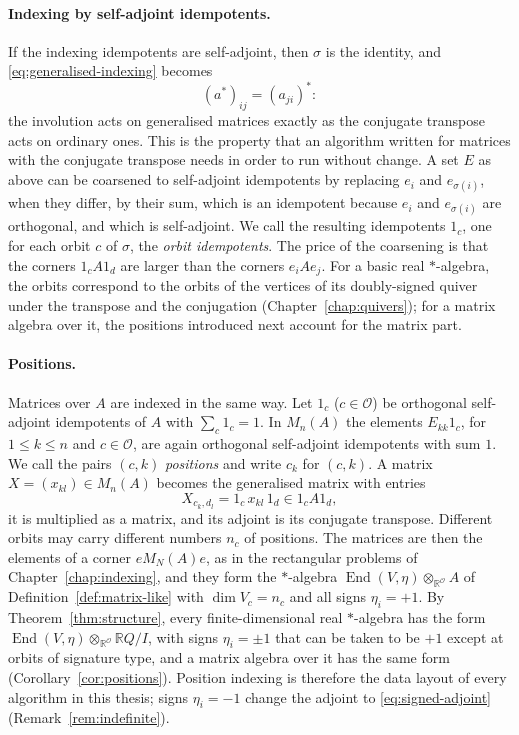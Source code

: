 \documentclass[12pt, a4paper]{report}
\theoremstyle{plain}
\theoremstyle{definition}
\theoremstyle{remark}
\theoremstyle{plain}
\newcommand{\RR}{\mathbb{R}}
\DeclareMathOperator{\End}{End}
\begin{document}
\paragraph{Indexing by self-adjoint idempotents.} If the indexing idempotents are self-adjoint, then $\sigma$ is the identity, and \eqref{eq:generalised-indexing} becomes
\[ (a^*)_{ij}=(a_{ji})^* : \]
the involution acts on generalised matrices exactly as the conjugate transpose acts on ordinary ones. This is the property that an algorithm written for matrices with the conjugate transpose needs in order to run without change. A set $E$ as above can be coarsened to self-adjoint idempotents by replacing $e_i$ and $e_{\sigma(i)}$, when they differ, by their sum, which is an idempotent because $e_i$ and $e_{\sigma(i)}$ are orthogonal, and which is self-adjoint. We call the resulting idempotents $1_c$, one for each orbit $c$ of $\sigma$, the \emph{orbit idempotents}. The price of the coarsening is that the corners $1_cA1_d$ are larger than the corners $e_iAe_j$. For a basic real $*$-algebra, the orbits correspond to the orbits of the vertices of its doubly-signed quiver under the transpose and the conjugation (Chapter~\ref{chap:quivers}); for a matrix algebra over it, the positions introduced next account for the matrix part.

\paragraph{Positions.} Matrices over $A$ are indexed in the same way. Let $1_c$ ($c\in\mathcal O$) be orthogonal self-adjoint idempotents of $A$ with $\sum_c1_c=1$. In $M_n(A)$ the elements $E_{kk}1_c$, for $1\leq k\leq n$ and $c\in\mathcal O$, are again orthogonal self-adjoint idempotents with sum $1$. We call the pairs $(c,k)$ \emph{positions} and write $c_k$ for $(c,k)$. A matrix $X=(x_{kl})\in M_n(A)$ becomes the generalised matrix with entries
\[ X_{c_k,d_l}=1_c\,x_{kl}\,1_d\in1_cA1_d , \]
it is multiplied as a matrix, and its adjoint is its conjugate transpose. Different orbits may carry different numbers $n_c$ of positions. The matrices are then the elements of a corner $eM_N(A)e$, as in the rectangular problems of Chapter~\ref{chap:indexing}, and they form the $*$-algebra $\End(V,\eta)\otimes_{\RR^{\mathcal O}}A$ of Definition~\ref{def:matrix-like} with $\dim V_c=n_c$ and all signs $\eta_i=+1$. By Theorem~\ref{thm:structure}, every finite-dimensional real $*$-algebra has the form $\End(V,\eta)\otimes_{\RR^{\mathcal O}}\RR Q/I$, with signs $\eta_i=\pm1$ that can be taken to be $+1$ except at orbits of signature type, and a matrix algebra over it has the same form (Corollary~\ref{cor:positions}). Position indexing is therefore the data layout of every algorithm in this thesis; signs $\eta_i=-1$ change the adjoint to \eqref{eq:signed-adjoint} (Remark~\ref{rem:indefinite}).
\end{document}

